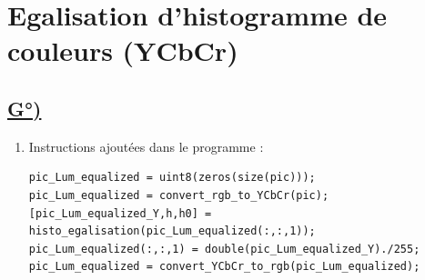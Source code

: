 \documentclass{article}
\begin{document}
\section*{Egalisation d’histogramme de couleurs (YCbCr)}
\subsection*{\underline{G°)}}

\begin{enumerate}[label=\arabic*$\degres$)]
	\item Instructions ajoutées dans le programme :
\begin{lstlisting}
pic_Lum_equalized = uint8(zeros(size(pic)));
pic_Lum_equalized = convert_rgb_to_YCbCr(pic);
[pic_Lum_equalized_Y,h,h0] = histo_egalisation(pic_Lum_equalized(:,:,1));
pic_Lum_equalized(:,:,1) = double(pic_Lum_equalized_Y)./255;
pic_Lum_equalized = convert_YCbCr_to_rgb(pic_Lum_equalized);
\end{lstlisting}
\end{enumerate}
\end{document}
